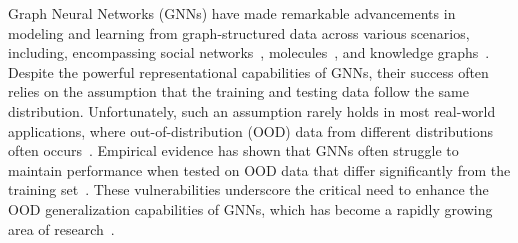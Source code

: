 Graph Neural Networks (GNNs) have made remarkable advancements in modeling and learning from graph-structured data across various scenarios, including, encompassing social networks~\citep{fan2020graph,chang2021sequential,li2022cyclic}, molecules~\citep{shui2020heterogeneous,liu2024data}, and knowledge graphs~\citep{kg_1,kg_2}. Despite the powerful representational capabilities of GNNs, their success often relies on the assumption that the training and testing data follow the same distribution. Unfortunately, such an assumption rarely holds in most real-world applications, where out-of-distribution (OOD) data from different distributions often occurs~\citep{OODsurvey,Obenchmark}. Empirical evidence has shown that GNNs often struggle to maintain performance when tested on OOD data that differ significantly from the training set~\citep{OODbench,li2022ood}. These vulnerabilities underscore the critical need to enhance the OOD generalization capabilities of GNNs, which has become a rapidly growing area of research~\citep{good,drugood,liu2024arc,pan2023prem}.

